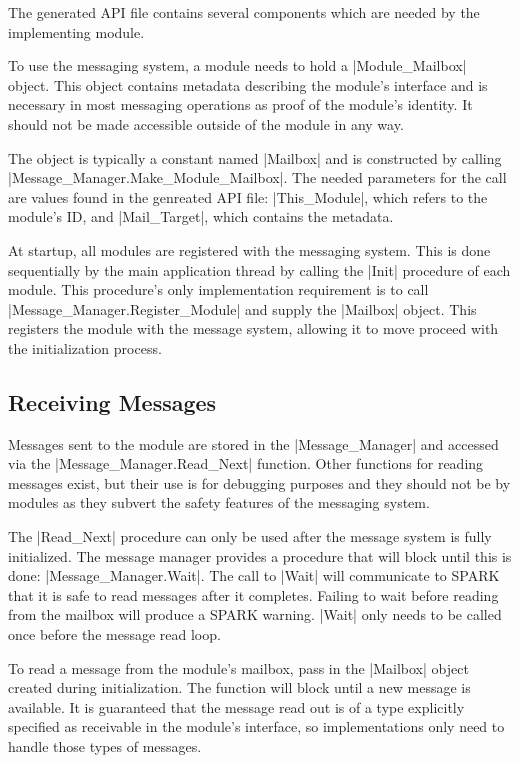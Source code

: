The generated API file contains several components which are needed by the implementing module.

To use the messaging system, a module needs to hold a |Module_Mailbox| object. This object contains metadata describing the module's interface and is necessary in most messaging operations as proof of the module's identity. It should not be made accessible outside of the module in any way.

The object is typically a constant named |Mailbox| and is constructed by calling |Message_Manager.Make_Module_Mailbox|. The needed parameters for the call are values found in the genreated API file: |This_Module|, which refers to the module's ID, and |Mail_Target|, which contains the metadata.

At startup, all modules are registered with the messaging system. This is done sequentially by the main application thread by calling the |Init| procedure of each module. This procedure's only implementation requirement is to call |Message_Manager.Register_Module| and supply the |Mailbox| object. This registers the module with the message system, allowing it to move proceed with the initialization process.

\subsection{Receiving Messages}

Messages sent to the module are stored in the |Message_Manager| and accessed via the |Message_Manager.Read_Next| function. Other functions for reading messages exist, but their use is for debugging purposes and they should not be by modules as they subvert the safety features of the messaging system.

The |Read_Next| procedure can only be used after the message system is fully initialized. The message manager provides a procedure that will block until this is done: |Message_Manager.Wait|. The call to |Wait| will communicate to SPARK that it is safe to read messages after it completes. Failing to wait before reading from the mailbox will produce a SPARK warning. |Wait| only needs to be called once before the message read loop.

To read a message from the module's mailbox, pass in the |Mailbox| object created during initialization. The function will block until a new message is available. It is guaranteed that the message read out is of a type explicitly specified as receivable in the module's interface, so implementations only need to handle those types of messages.

